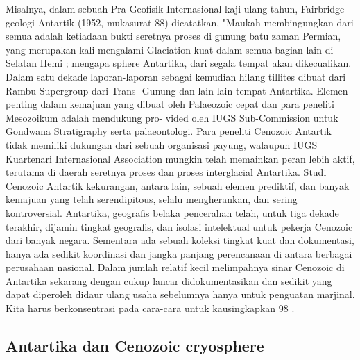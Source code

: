 		Misalnya, dalam sebuah Pra-Geofisik Internasional kaji ulang tahun, Fairbridge geologi Antartik (1952, mukasurat 88) dicatatkan, 
	"Maukah membingungkan dari semua adalah ketiadaan bukti seretnya proses di gunung batu zaman Permian, yang merupakan kali mengalami Glaciation 
	kuat dalam semua bagian lain di Selatan Hemi ; mengapa sphere Antartika, dari segala tempat akan dikecualikan. Dalam satu dekade laporan-laporan 
	sebagai kemudian hilang tillites dibuat dari Rambu Supergroup dari Trans- Gunung dan lain-lain tempat Antartika. Elemen penting dalam kemajuan yang 
	dibuat oleh Palaeozoic cepat dan para peneliti Mesozoikum adalah mendukung pro- vided oleh IUGS Sub-Commission untuk Gondwana Stratigraphy serta 
	palaeontologi. Para peneliti Cenozoic Antartik tidak memiliki dukungan dari sebuah organisasi payung, walaupun IUGS Kuartenari Internasional Association 
	mungkin telah memainkan peran lebih aktif, terutama di daerah seretnya proses dan proses interglacial Antartika. Studi Cenozoic Antartik kekurangan, 
	antara lain, sebuah elemen prediktif, dan banyak kemajuan yang telah serendipitous, selalu mengherankan, dan sering kontroversial. 
	Antartika, geografis belaka pencerahan telah, untuk tiga dekade terakhir, dijamin tingkat geografis, dan isolasi intelektual untuk pekerja Cenozoic 
	dari banyak negara. Sementara ada sebuah koleksi tingkat kuat dan dokumentasi, hanya ada sedikit koordinasi dan jangka panjang perencanaan di antara 
	berbagai perusahaan nasional. Dalam jumlah relatif kecil melimpahnya sinar Cenozoic di Antartika sekarang dengan cukup lancar didokumentasikan dan 
	sedikit yang dapat diperoleh didaur ulang usaha sebelumnya hanya untuk penguatan marjinal. Kita harus berkonsentrasi pada cara-cara untuk kausingkapkan 
	98%
	\cite{peter1990Antartica}.
	

\subsection{Antartika dan Cenozoic cryosphere}

